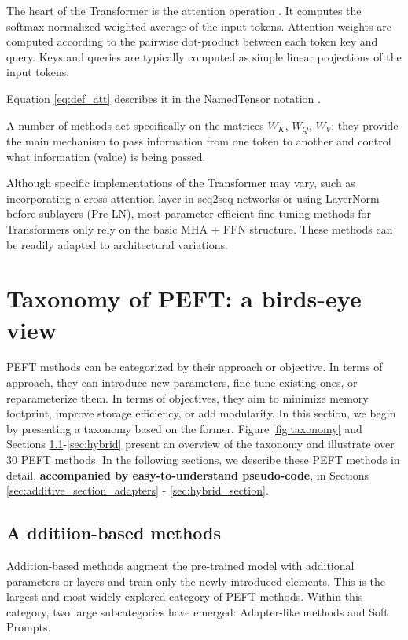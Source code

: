 The heart of the Transformer is the attention operation \citep{bahdanau2014neural}. It computes the softmax-normalized weighted average of the input tokens. Attention weights are computed according to the pairwise dot-product between each token key and query. Keys and queries are typically computed as simple linear projections of the input tokens.

Equation \ref{eq:def_att} describes it in the NamedTensor notation \citep{named_tensor}.

A number of methods act specifically on the matrices $W_K$, $W_Q$, $W_V$; they provide the main mechanism to pass information from one token to another and control what information (value) is being passed.

Although specific implementations of the Transformer may vary, such as incorporating a cross-attention layer in seq2seq networks or using LayerNorm before sublayers (Pre-LN), most parameter-efficient fine-tuning methods for Transformers only rely on the basic MHA + FFN structure. These methods can be readily adapted to architectural variations.

\section{Taxonomy of PEFT: a birds-eye view}
\label{sec:taxonomy}

PEFT methods can be categorized by their approach or objective. In terms of approach, they can introduce new parameters, fine-tune existing ones, or reparameterize them. In terms of objectives, they aim to minimize memory footprint, improve storage efficiency, or add modularity. In this section, we begin by presenting a taxonomy based on the former. Figure \ref{fig:taxonomy} and Sections \ref{sec:additive}-\ref{sec:hybrid} present an overview of the taxonomy and illustrate over 30 PEFT methods. In the following sections, we describe these PEFT methods in detail, \textbf{accompanied by easy-to-understand pseudo-code}, in Sections \ref{sec:additive_section_adapters} - \ref{sec:hybrid_section}.

\subsection{\textcolor{a_color}{A} dditiion-based methods}
\label{sec:additive}

Addition-based methods augment the pre-trained model with additional parameters or layers and train only the newly introduced elements. This is the largest and most widely explored category of PEFT methods. Within this category, two large subcategories have emerged: Adapter-like methods and Soft Prompts.

